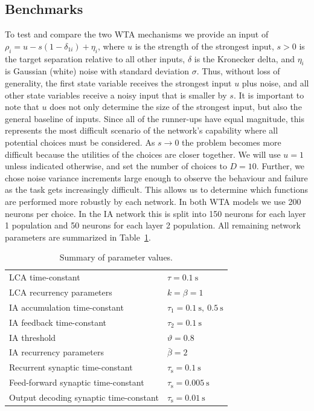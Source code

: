 \documentclass[10pt,letterpaper]{article}
\begin{document}
\subsection{Benchmarks}
To test and compare the two WTA mechanisms we provide an input of $\rho_i = u - s(1 - \delta_{1i}) + \eta_i$, where $u$ is the strength of the strongest input, 
$s > 0$ is the target separation relative to all other inputs, $\delta$ is the Kronecker delta, and $\eta_i$ is Gaussian (white) noise with standard deviation $\sigma$.
Thus, without loss of generality, the first state variable receives the strongest input $u$ plus noise, and all other state variables receive a noisy input that is smaller by $s$.
It is important to note that $u$ does not only determine the size of the strongest input, but also the general baseline of inputs.
Since all of the runner-ups have equal magnitude, this represents the most difficult scenario of the network's capability where all potential choices must be considered.
As $s \rightarrow 0$ the problem becomes more difficult because the utilities of the choices are closer together.
We will use $u = 1$ unless indicated otherwise, and set the number of choices to $D = 10$.
Further, we chose noise variance increments large enough to observe the behaviour and failure as the task gets increasingly difficult.
This allows us to determine which functions are performed more robustly by each network.
In both WTA models we use 200 neurons per choice.
In the IA network this is split into 150 neurons for each layer 1 population and 50 neurons for each layer 2 population.
All remaining network parameters are summarized in Table~\ref{tbl:params}.
\begin{table}
    \caption{Summary of parameter values.}\label{tbl:params}
    \begin{tabular}{ll}
        LCA time-constant & $\tau = \SI{0.1}{\second}$ \\
        LCA recurrency parameters & $k = \beta = 1$ \\
        IA accumulation time-constant & $\tau_1 = \SI{0.1}{\second},\ \SI{0.5}{\second}$ \\
        IA feedback time-constant & $\tau_2 = \SI{0.1}{\second}$ \\
        IA threshold & $\vartheta = 0.8$ \\
        IA recurrency parameters & $\bar{\beta} = 2$ \\
        Recurrent synaptic time-constant & $\tau_{\mathrm{s}} 
        = \SI{0.1}{\second}$ \\
        Feed-forward synaptic time-constant & $\tau_{\mathrm{s}} 
        = \SI{0.005}{\second}$ \\
        Output decoding synaptic time-constant & $\tau_{\mathrm{s}} 
        = \SI{0.01}{\second}$
    \end{tabular}
\end{table}
\end{document}
